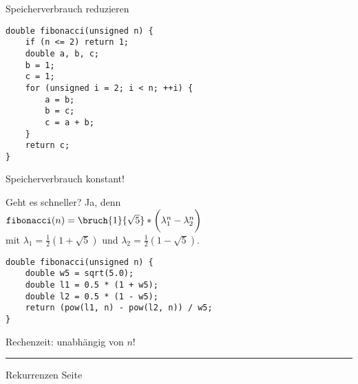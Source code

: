 \begin{slide}{}
\normalsize

\begin{center}
Speicherverbrauch reduzieren
\end{center}
\vspace*{0.5cm}

\footnotesize
\begin{verbatim}
double fibonacci(unsigned n) {
    if (n <= 2) return 1;
    double a, b, c;
    b = 1;
    c = 1;
    for (unsigned i = 2; i < n; ++i) {
        a = b; 
        b = c;
        c = a + b;
    }
    return c;
}
\end{verbatim}
Speicherverbrauch konstant!

Geht es schneller? Ja, denn \normalsize \\[0.3cm]
\hspace*{1.3cm} $\mathtt{fibonacci}(n) = \bruch{1}{\sqrt{5}}* \bigg( \lambda_1^n - \lambda_2^n \bigg)$ \\[0.3cm]
\footnotesize 
mit \quad $\lambda_1 = \frac{1}{2}(1 + \sqrt{5})$ \quad 
und \quad $\lambda_2 = \frac{1}{2}(1 - \sqrt{5})$.

\begin{verbatim}
double fibonacci(unsigned n) {
    double w5 = sqrt(5.0);
    double l1 = 0.5 * (1 + w5);
    double l2 = 0.5 * (1 - w5);
    return (pow(l1, n) - pow(l2, n)) / w5;  
}
\end{verbatim}

Rechenzeit: unabh\"angig von $n$!


\vspace*{\fill}
\tiny \addtocounter{mypage}{1}
\rule{17cm}{1mm}
Rekurrenzen  \hspace*{\fill} Seite 
\end{slide}


